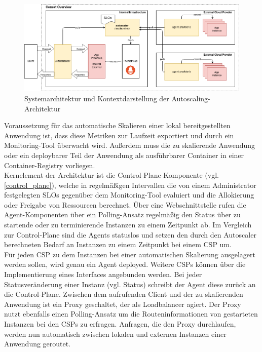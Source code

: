 \documentclass[runningheads]{llncs}
\begin{document}
\begin{figure}
	\centering
	\includegraphics[width=1.0\linewidth,scale=1.0]{images/context.png}
	\caption{Systemarchitektur und Kontextdarstellung der Autoscaling-Architektur}
	\label{systemarchitektur}
\end{figure}

Voraussetzung für das automatische Skalieren einer lokal bereitgestellten Anwendung ist, dass diese Metriken zur Laufzeit exportiert und durch ein Monitoring-Tool überwacht wird. Außerdem muss die zu skalierende Anwendung oder ein deploybarer Teil der Anwendung als ausführbarer Container in einer Container-Registry vorliegen. \\

Kernelement der Architektur ist die Control-Plane-Komponente (vgl. \ref{control_plane}), welche in regelmäßigen Intervallen die von einem Administrator festgelegten SLOs gegen\-über dem Monitoring-Tool evaluiert und die Allokierung oder Freigabe von Ressourcen berechnet. Über eine Webschnittstelle rufen die Agent-Komponenten über ein Polling-Ansatz regelmäßig den Status über zu startende oder zu terminierende Instanzen zu einem Zeitpunkt ab. Im Vergleich zur Control-Plane sind die Agents statuslos und setzen den durch den Autoscaler berechneten Bedarf an Instanzen zu einem Zeitpunkt bei einem CSP um. \\

Für jeden CSP zu dem Instanzen bei einer automatischen Skalierung ausgelagert werden sollen, wird genau ein Agent deployed. Weitere CSPs können über die Implementierung eines Interfaces angebunden werden. Bei jeder Statusveränderung einer Instanz (vgl. Status) schreibt der Agent diese zurück an die Control-Plane. Zwischen dem aufrufenden Client und der zu skalierenden Anwendung ist ein Proxy geschaltet, der als Loadbalancer agiert. Der Proxy nutzt ebenfalls einen Polling-Ansatz um die Routeninformationen von gestarteten Instanzen bei den CSPs zu erfragen. Anfragen, die den Proxy durchlaufen, werden nun automatisch zwischen lokalen und externen Instanzen einer Anwendung geroutet.
\end{document}
